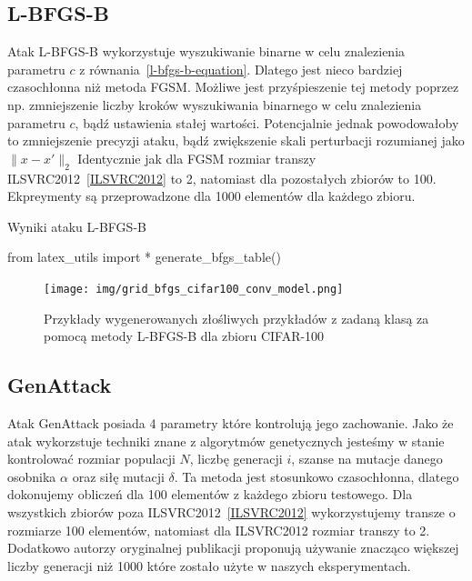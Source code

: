 \documentclass[
    left=2.5cm,         %
    right=2.5cm,        %
    top=2.5cm,          %
    bottom=3cm,         %
    bindingoffset=6mm,  %
    nohyphenation=false %
]{eiti/eiti-thesis}
\begin{document}
\subsection{L-BFGS-B}
Atak L-BFGS-B wykorzystuje wyszukiwanie binarne w celu znalezienia parametru \(c\) z równania~\ref{l-bfgs-b-equation}.
Dlatego jest nieco bardziej czasochłonna niż metoda FGSM. Możliwe jest przyśpieszenie tej metody poprzez np.
zmniejszenie liczby kroków wyszukiwania binarnego w celu znalezienia parametru \(c\), bądź ustawienia stałej wartości.
Potencjalnie jednak powodowałoby to zmniejszenie precyzji ataku, bądź zwiększenie skali perturbacji rozumianej jako
\(\|x-x'\|_2\)
Identycznie jak dla FGSM rozmiar transzy ILSVRC2012~\ref{ILSVRC2012} to 2, natomiast dla pozostałych zbiorów to 100.
Ekpreymenty są przeprowadzone dla 1000 elementów dla każdego zbioru.

\begin{table}[H]
\caption{Wyniki ataku L-BFGS-B}
\begin{adjustbox}{max width=\textwidth}
\begin{pycode}
from latex_utils import *
generate_bfgs_table()
\end{pycode}
\end{adjustbox}
\end{table}

\begin{figure}[H]
    \texttt{[image: img/grid\_bfgs\_cifar100\_conv\_model.png]}
    \caption{Przykłady wygenerowanych złośliwych przykładów z zadaną klasą za pomocą metody L-BFGS-B dla zbioru CIFAR-100}
    \label{fig:cifar100_grid_bfgs}
\end{figure}


\subsection{GenAttack}
Atak GenAttack posiada 4 parametry które kontrolują jego zachowanie. Jako że atak wykorzstuje techniki
znane z algorytmów genetycznych jesteśmy w stanie kontrolować rozmiar populacji $N$, liczbę generacji $i$, szanse na mutacje
danego osobnika $\alpha$ oraz siłę mutacji $\delta$.
Ta metoda jest stosunkowo czasochłonna, dlatego dokonujemy obliczeń dla 100 elementów z każdego zbioru testowego.
Dla wszystkich zbiorów poza ILSVRC2012~\ref{ILSVRC2012} wykorzystujemy transze o rozmiarze 100 elementów, natomiast dla ILSVRC2012 rozmiar transzy to 2.
Dodatkowo autorzy oryginalnej publikacji proponują używanie znacząco większej liczby generacji niż 1000 które zostało użyte w naszych eksperymentach.
\end{document}
